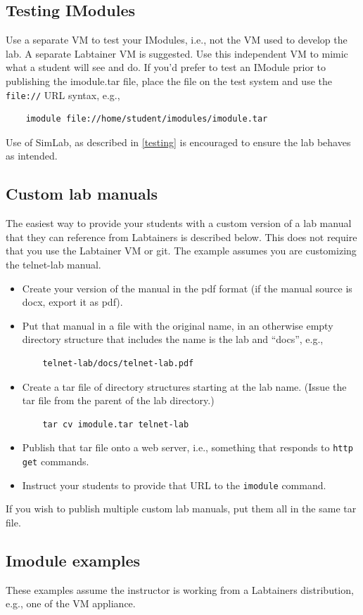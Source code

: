 \documentclass[12pt]{article}
\begin{document}
\subsection{Testing IModules}
Use a separate VM to test your IModules, i.e., not the VM used to develop the lab.  A separate
Labtainer VM is suggested.  Use this independent VM to mimic what a student will see and do.  If
you'd prefer to test an IModule prior to publishing the imodule.tar file, place the file on the
test system and use the {\tt file://} URL syntax, e.g.,
\begin{verbatim}
    imodule file://home/student/imodules/imodule.tar
\end{verbatim} 
\noindent Use of SimLab, as described in \ref{testing} is encouraged to ensure the lab behaves as intended.

\subsection {Custom lab manuals}
The easiest way to provide your students with a custom version of a lab manual that they can reference from Labtainers
is described below.  This does not require that you use the Labtainer VM or git. The example assumes you are customizing
the telnet-lab manual.
\begin{itemize}
\item Create your version of the manual in the pdf format (if the manual source is docx, export it as pdf).
\item Put that manual in a file with the original name, in an otherwise empty directory structure that includes the name is the lab
and ``docs'', e.g.,
\begin{verbatim}
    telnet-lab/docs/telnet-lab.pdf
\end{verbatim}
\item Create a tar file of directory structures starting at the lab name.  (Issue the tar file from the parent of the lab directory.)
\begin{verbatim}
    tar cv imodule.tar telnet-lab
\end{verbatim}
\item Publish that tar file onto a web server, i.e., something that responds to {\tt http get} commands.
\item Instruct your students to provide that URL to the {\tt imodule} command. 
\end{itemize}
If you wish to publish multiple custom lab manuals, put them all in the same tar file.
\subsection {Imodule examples}  
These examples assume the instructor is working from a Labtainers distribution, e.g., one
of the VM appliance.
\end{document}
